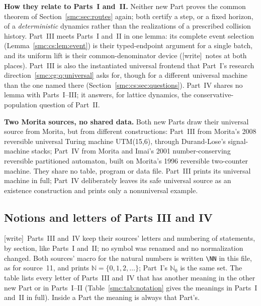 \documentclass[11pt,letterpaper]{article}
\numberwithin{equation}{section}
\theoremstyle{definition}
\theoremstyle{remark}
\newcommand{\N}{\mathbb N_0}
\newcommand{\NN}{\mathbb N}
\newcommand{\wtag}{\textup{[write]}}
\begin{document}
\textbf{How they relate to Parts~I and~II.} Neither new Part proves the common theorem of Section~\ref{smc:sec:routes} again; both certify a step, or a fixed horizon, of a \emph{deterministic} dynamics rather than the realizations of a prescribed collision history. Part~III meets Parts~I and~II in one lemma: its complete event selection (Lemma~\ref{smc:cs:lem:event}) is their typed-endpoint argument for a single batch, and its uniform lift is their common-denominator device (\wtag\ notes at both places). Part~III is also the instantiated universal frontend that Part~I's research direction~\ref{smc:cg:q:universal} asks for, though for a different universal machine than the one named there (Section~\ref{smc:cs:sec:questions}). Part~IV shares no lemma with Parts~I--III; it answers, for lattice dynamics, the conservative-population question of Part~II.

\textbf{Two Morita sources, no shared data.} Both new Parts draw their universal source from Morita, but from different constructions: Part~III from Morita's 2008 reversible universal Turing machine UTM(15,6), through Durand-Lose's signal-machine stacks; Part~IV from Morita and Imai's 2001 number-conserving reversible partitioned automaton, built on Morita's 1996 reversible two-counter machine. They share no table, program or data file. Part~III prints its universal machine in full; Part~IV deliberately leaves its safe universal source as an existence construction and prints only a nonuniversal example.

\subsection{Notions and letters of Parts III and IV}\label{smc:cs:sec:notation}

\wtag\ Parts~III and~IV keep their sources' letters and numbering of statements, by section, like Parts~I and~II; no symbol was renamed and no normalization changed. Both sources' macro for the natural numbers is written \verb|\NN| in this file, as for source~11, and prints $\NN=\{0,1,2,\ldots\}$; Part~I's $\N$ is the same set. The table lists every letter of Parts~III and~IV that has another meaning in the other new Part or in Parts~I--II (Table~\ref{smc:tab:notation} gives the meanings in Parts~I and~II in full). Inside a Part the meaning is always that Part's.
\end{document}

